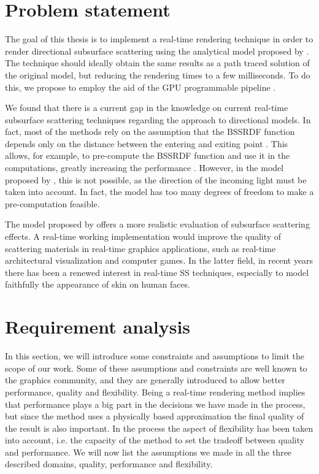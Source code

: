\section{Problem statement}

The goal of this thesis is to implement a real-time rendering technique in order to render directional subsurface scattering using the analytical model proposed by \cite{IMM2013-06646}. The technique should ideally obtain the same results as a path traced solution of the original model, but reducing the rendering times to a few milliseconds. To do this, we propose to employ the aid of the GPU programmable pipeline \citep{Fernando:2004:GGP:983868}. 

We found that there is a current gap in the knowledge on current real-time subsurface scattering techniques regarding the approach to directional models. In fact, most of the methods rely on the assumption that the BSSRDF function depends only on the distance between the entering and exiting point \cite{Jensen:2001:PMS:383259.383319}. This allows, for example, to pre-compute the BSSRDF function and use it in the computations, greatly increasing the performance \citep{4736459}. However, in the model proposed by \cite{IMM2013-06646}, this is not possible, as the direction of the incoming light must be taken into account. In fact, the model has too many degrees of freedom to make a pre-computation feasible. 

The model proposed by \cite{IMM2013-06646} offers a more realistic evaluation of subsurface scattering effects. A real-time working implementation would improve the quality of scattering materials in real-time graphics applications, such as real-time architectural visualization and computer games. In the latter field, in recent years there has been a renewed interest in real-time SS techniques, especially to model faithfully the appearance of skin on human faces. 

\section{Requirement analysis}

In this section, we will introduce some constraints and assumptions to limit the scope of our work. Some of these assumptions and constraints are well known to the graphics community, and they are generally introduced to allow better performance, quality and flexibility. Being a real-time rendering method implies that performance plays a big part in the decisions we have made in the process, but since the method uses a physically based approximation the final quality of the result is also important. In the process the aspect of flexibility has been taken into account, i.e. the capacity of the method to set the tradeoff between quality and performance. We will now list the assumptions we made in all the three described domains, quality, performance and flexibility. 

